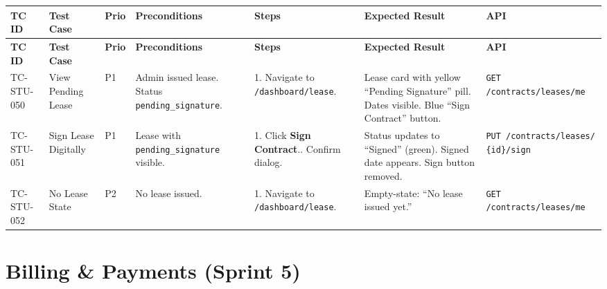 \documentclass[12pt,a4paper]{article}
\begin{document}
\begin{longtable}{L{2cm} L{3cm} L{1cm} L{4cm} L{5.5cm} L{5.5cm} L{3cm}}
\toprule
\textbf{TC ID} & \textbf{Test Case} & \textbf{Prio} & \textbf{Preconditions} & \textbf{Steps} & \textbf{Expected Result} & \textbf{API} \\
\midrule
\endfirsthead
\toprule
\textbf{TC ID} & \textbf{Test Case} & \textbf{Prio} & \textbf{Preconditions} & \textbf{Steps} & \textbf{Expected Result} & \textbf{API} \\
\midrule
\endhead
\bottomrule
\endfoot

TC-STU-050
& View Pending Lease
& P1
& Admin issued lease. Status \texttt{pending\_signature}.
& 1. Navigate to \texttt{/dashboard/lease}.
& Lease card with yellow ``Pending Signature'' pill. Dates visible. Blue ``Sign Contract'' button.
& \texttt{GET /contracts/leases/me}
\\
\midrule

TC-STU-051
& Sign Lease Digitally
& P1
& Lease with \texttt{pending\_signature} visible.
& 1. Click \textbf{Sign Contract}.. Confirm dialog.
& Status updates to ``Signed'' (green). Signed date appears. Sign button removed.
& \texttt{PUT /contracts/leases/ \{id\}/sign}
\\
\midrule

TC-STU-052
& No Lease State
& P2
& No lease issued.
& 1. Navigate to \texttt{/dashboard/lease}.
& Empty-state: ``No lease issued yet.''
& \texttt{GET /contracts/leases/me}
\\

\end{longtable}


\section{Billing \& Payments (Sprint 5)}
\end{document}
